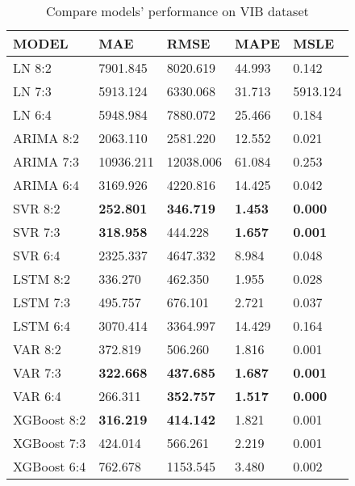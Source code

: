 \documentclass{ieeeojies}
\begin{document}
\begin{table}[h]
\renewcommand{\arraystretch}{1.5}
\centering
\caption{Compare models' performance on VIB dataset}
\label{tab6}
\begin{tabular}{lp{1.1cm}p{1.2cm}p{1cm}p{0.9cm}}
\hline
\rowcolor{headercolor}
\textbf{MODEL}  & \textbf{MAE} & \textbf{RMSE} & \textbf{MAPE} & \textbf{MSLE}\\
\hline
\cellcolor{firstcolcolor} LN 8:2 & 7901.845 & 8020.619 & 44.993 & 0.142\\
\cellcolor{firstcolcolor} LN 7:3 & 5913.124 & 6330.068 & 31.713 & 5913.124\\
\cellcolor{firstcolcolor} LN 6:4 & 5948.984 & 7880.072 & 25.466 & 0.184\\
\cellcolor{firstcolcolor} ARIMA 8:2 & 2063.110 & 2581.220 & 12.552 & 0.021 \\
\cellcolor{firstcolcolor} ARIMA 7:3 & 10936.211 & 12038.006 & 61.084 & 0.253 \\
\cellcolor{firstcolcolor} ARIMA 6:4 & 3169.926 & 4220.816 & 14.425 & 0.042 \\
\cellcolor{firstcolcolor} SVR 8:2 & \textbf{252.801} & \textbf{346.719} & \textbf{1.453} & \textbf{0.000} \\
\cellcolor{firstcolcolor} SVR 7:3 & \textbf{318.958} & 444.228 & \textbf{1.657} & \textbf{0.001} \\
\cellcolor{firstcolcolor} SVR 6:4 & 2325.337 & 4647.332 & 8.984 & 0.048 \\
\cellcolor{firstcolcolor} LSTM 8:2 & 336.270 & 462.350 & 1.955 & 0.028 \\
\cellcolor{firstcolcolor} LSTM 7:3 & 495.757 & 676.101 & 2.721 & 0.037 \\
\cellcolor{firstcolcolor} LSTM 6:4 & 3070.414 & 3364.997 & 14.429 & 0.164 \\
\cellcolor{firstcolcolor} VAR 8:2 & 372.819 & 506.260 & 1.816 & 0.001 \\
\cellcolor{firstcolcolor} VAR 7:3 & \textbf{322.668} & \textbf{437.685} & \textbf{1.687} & \textbf{0.001} \\
\cellcolor{firstcolcolor} VAR 6:4 & 266.311 & \textbf{352.757} & \textbf{1.517} & \textbf{0.000} \\
\cellcolor{firstcolcolor} XGBoost 8:2 & \textbf{316.219} & \textbf{414.142} & 1.821 & 0.001 \\
\cellcolor{firstcolcolor} XGBoost 7:3 & 424.014 & 566.261 & 2.219 & 0.001 \\
\cellcolor{firstcolcolor} XGBoost 6:4 & 762.678 & 1153.545 & 3.480 & 0.002 \\

\end{tabular}
\end{table}
\end{document}
